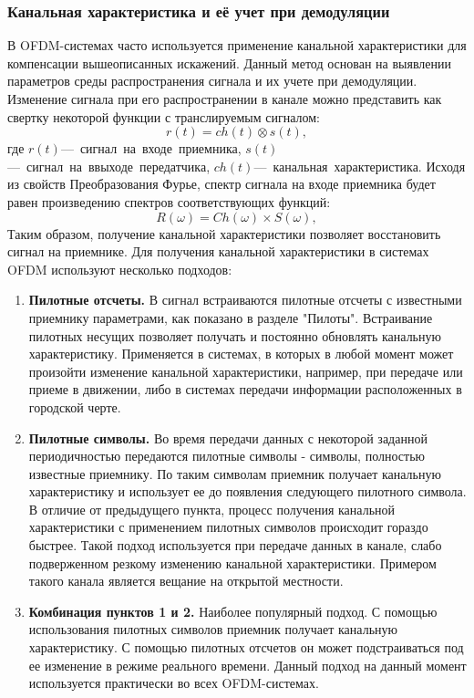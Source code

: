 \subsubsection{Канальная характеристика и её учет при демодуляции}
В OFDM-системах часто используется применение канальной характеристики для компенсации вышеописанных искажений. Данный метод основан на выявлении параметров среды распространения сигнала и их учете при демодуляции. \newline
Изменение сигнала при его распространении в канале можно представить как свертку некоторой функции с транслируемым сигналом:
\begin{equation}
\label{ch:eq:character}
r(t) = ch(t)\otimes s(t),
\end{equation}
где \newline
\quad $r(t)$\quad \mbox{--- сигнал на входе приемника,} \newline
\quad $s(t)$\quad \mbox{--- сигнал на ввыходе передатчика,} \newline
\quad $ch(t)$\quad \mbox{--- канальная характеристика.} \newline
Исходя из свойств Преобразования Фурье, спектр сигнала на входе приемника будет равен произведению спектров соответствующих функций:
\begin{equation}
\label{ch:eq:character_spec}
R(\omega) = Ch(\omega)\times S(\omega),
\end{equation}
Таким образом, получение канальной характеристики позволяет восстановить сигнал на приемнике. Для получения канальной характеристики в системах OFDM используют несколько подходов:
\begin{enumerate}
	\item \textbf{Пилотные отсчеты.} В сигнал встраиваются пилотные отсчеты с известными приемнику параметрами, как показано в разделе "Пилоты". %
Встраивание пилотных несущих позволяет получать и постоянно обновлять канальную характеристику. Применяется в системах, в которых в любой момент может произойти изменение канальной характеристики, например, при передаче или приеме в движении, либо в системах передачи информации расположенных в городской черте.
	\item \textbf{Пилотные символы.} Во время передачи данных с некоторой заданной периодичностью передаются пилотные символы - символы, полностью известные приемнику. По таким символам приемник получает канальную характеристику и использует ее до появления следующего пилотного символа. В отличие от предыдущего пункта, процесс получения канальной характеристики с применением пилотных символов происходит гораздо быстрее. Такой подход используется при передаче данных в канале, слабо подверженном резкому изменению канальной характеристики. Примером такого канала является вещание на открытой местности.
	\item \textbf{Комбинация пунктов 1 и 2.} Наиболее популярный подход. С помощью использования пилотных символов приемник получает канальную характеристику. С помощью пилотных отсчетов он может подстраиваться под ее изменение в режиме реального времени. Данный подход на данный момент используется практически во всех OFDM-системах.
\end{enumerate}